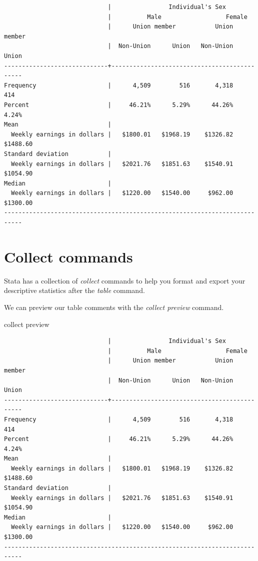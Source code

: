 \documentclass[
]{book}
\newenvironment{Shaded}{\begin{snugshade}}{\end{snugshade}}
\newcommand{\NormalTok}[1]{#1}
\begin{document}
\begin{verbatim}
                             |                Individual's Sex             
                             |          Male                  Female       
                             |      Union member           Union member    
                             |  Non-Union      Union   Non-Union      Union
-----------------------------+---------------------------------------------
Frequency                    |      4,509        516       4,318        414
Percent                      |     46.21%      5.29%      44.26%      4.24%
Mean                         |                                             
  Weekly earnings in dollars |   $1800.01   $1968.19    $1326.82   $1488.60
Standard deviation           |                                             
  Weekly earnings in dollars |   $2021.76   $1851.63    $1540.91   $1054.90
Median                       |                                             
  Weekly earnings in dollars |   $1220.00   $1540.00     $962.00   $1300.00
---------------------------------------------------------------------------
\end{verbatim}

\section{Collect commands}\label{collect-commands}

Stata has a collection of \emph{collect} commands to help you format and export your descriptive statistics after the \emph{table} command.

We can preview our table comments with the \emph{collect preview} command.

\begin{Shaded}
\begin{Highlighting}[]
\NormalTok{collect preview}
\end{Highlighting}
\end{Shaded}

\begin{verbatim}
                             |                Individual's Sex             
                             |          Male                  Female       
                             |      Union member           Union member    
                             |  Non-Union      Union   Non-Union      Union
-----------------------------+---------------------------------------------
Frequency                    |      4,509        516       4,318        414
Percent                      |     46.21%      5.29%      44.26%      4.24%
Mean                         |                                             
  Weekly earnings in dollars |   $1800.01   $1968.19    $1326.82   $1488.60
Standard deviation           |                                             
  Weekly earnings in dollars |   $2021.76   $1851.63    $1540.91   $1054.90
Median                       |                                             
  Weekly earnings in dollars |   $1220.00   $1540.00     $962.00   $1300.00
---------------------------------------------------------------------------
\end{verbatim}
\end{document}
